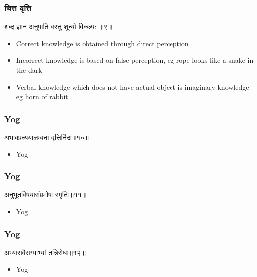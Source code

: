 \begin{frame}[fragile]\frametitle{चित्त वृत्ति}

\begin{sanskrit}
शब्द ज्ञान अनुपाति वस्तु शून्यो विकल्प: ॥९॥
\end{sanskrit}


	\begin{itemize}
	\item Correct knowledge is obtained through direct perception
	\item Incorrect knowledge is based on false perception, eg rope looks like a snake in the dark
	\item Verbal knowledge which does not have actual object is imaginary knowledge eg horn of rabbit
	\end{itemize}

\end{frame}

\begin{frame}[fragile]\frametitle{Yog}
\begin{sanskrit}
अभावप्रत्ययालम्बना वृत्तिर्निद्रा॥१०॥
\end{sanskrit}
	\begin{itemize}
	\item Yog 
	\end{itemize}
\end{frame}


\begin{frame}[fragile]\frametitle{Yog}
\begin{sanskrit}
अनुभूतविषयासंप्रमोषः स्मृतिः॥११॥
\end{sanskrit}
	\begin{itemize}
	\item Yog 
	\end{itemize}
\end{frame}


\begin{frame}[fragile]\frametitle{Yog}
\begin{sanskrit}
अभ्यासवैराग्याभ्यां तन्निरोधः॥१२॥
\end{sanskrit}
	\begin{itemize}
	\item Yog 
	\end{itemize}
\end{frame}


